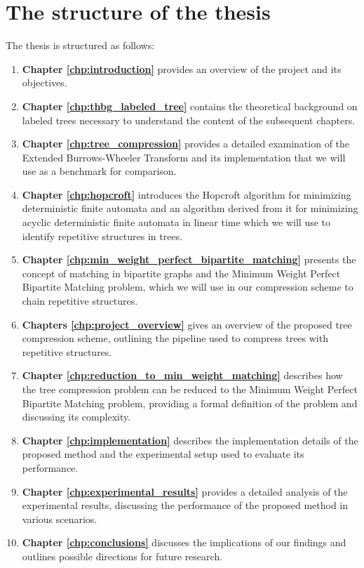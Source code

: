 \section{The structure of the thesis}
The thesis is structured as follows:
\begin{enumerate}
    \item \textbf{Chapter \ref{chp:introduction}} provides an overview of the project and its objectives.
    \item \textbf{Chapter \ref{chp:thbg_labeled_tree}} contains the theoretical background on labeled trees necessary to understand the content of the subsequent chapters.
    \item \textbf{Chapter \ref{chp:tree_compression}} provides a detailed examination of the Extended Burrows-Wheeler Transform and its implementation that we will use as a benchmark for comparison.
    \item \textbf{Chapter \ref{chp:hopcroft}} introduces the Hopcroft algorithm for minimizing deterministic finite automata and an algorithm derived from it for minimizing acyclic deterministic finite automata in linear time which we will use to identify repetitive structures in trees.
    \item \textbf{Chapter \ref{chp:min_weight_perfect_bipartite_matching}} presents the concept of matching in bipartite graphs and the Minimum Weight Perfect Bipartite Matching problem, which we will use in our compression scheme to chain repetitive structures.
    \item \textbf{Chapters \ref{chp:project_overview}} gives an overview of the proposed tree compression scheme, outlining the pipeline used to compress trees with repetitive structures.
    \item \textbf{Chapter \ref{chp:reduction_to_min_weight_matching}} describes how  the tree compression problem can be reduced to the Minimum Weight Perfect Bipartite Matching problem, providing a formal definition of the problem and discussing its complexity.
    \item \textbf{Chapter \ref{chp:implementation}} describes the implementation details of the proposed method and the experimental setup used to evaluate its performance.
    \item \textbf{Chapter \ref{chp:experimental_results}} provides a detailed analysis of the experimental results, discussing the performance of the proposed method in various scenarios.
    \item \textbf{Chapter \ref{chp:conclusions}} discusses the implications of our findings and outlines possible directions for future research.
\end{enumerate}